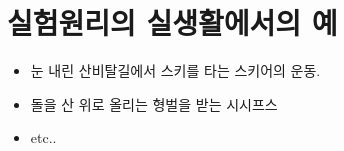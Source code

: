 \documentclass[12pt,a4paper]{article}
\begin{document}
\section{실험원리의 실생활에서의 예}
\begin{itemize}
    \item 눈 내린 산비탈길에서 스키를 타는 스키어의 운동.
    \item 돌을 산 위로 올리는 형벌을 받는 시시프스
    \item etc..
\end{itemize}
\end{document}
